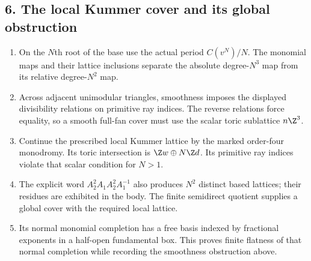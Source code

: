 \subsection*{6. The local Kummer cover and its global obstruction}
\RungOne
\begin{enumerate}[label=\arabic*.,leftmargin=*]
\item On the $N$th root of the base use the actual period
$C(v^N)/N$.  The monomial maps and their lattice inclusions
separate the absolute degree-$N^3$ map from its relative
degree-$N^2$ map.
\item Across adjacent unimodular triangles, smoothness imposes the
displayed divisibility relations on primitive ray indices.
The reverse relations force equality, so a smooth full-fan cover
must use the scalar toric sublattice $n\Z^3$.
\item Continue the prescribed local Kummer lattice by the marked
order-four monodromy.  Its toric intersection is
$\Z w\oplus N\Z d$.  Its primitive ray indices violate that
scalar condition for $N>1$.
\item The explicit word
$A_2^2A_1A_2^2A_1^{-1}$ also produces $N^2$ distinct based
lattices; their residues are exhibited in the body.  The finite
semidirect quotient supplies a global cover with the required
local lattice.
\item Its normal monomial completion has a free basis indexed by
fractional exponents in a half-open fundamental box.  This proves
finite flatness of that normal completion while recording the
smoothness obstruction above.
\end{enumerate}

